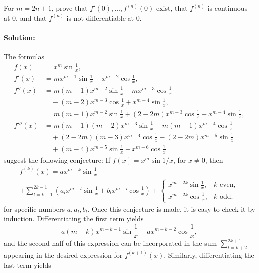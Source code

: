 \documentclass{article}
\begin{document}
For $m = 2n + 1$, prove that $f'(0), \ldots, f^{(n)}(0)$ exist, that $f^{(n)}$
is continuous at 0, and that $f^{(n)}$ is not differentiable at 0.

\paragraph{Solution:} The formulas \begin{align*}
  f(x) &= x^m\sin{\frac{1}{x}}, \\
  f'(x) &= mx^{m - 1}\sin{\frac{1}{x}} - x^{m - 2}\cos{\frac{1}{x}}, \\
  f''(x) &= m(m - 1)x^{m - 2}\sin{\frac{1}{x}} - mx^{m - 3}\cos{\frac{1}{x}} \\
    &\quad - (m - 2)x^{m - 3}\cos{\frac{1}{x}} + x^{m - 4}\sin{\frac{1}{x}}, \\
    &= m(m - 1)x^{m - 2}\sin{\frac{1}{x}} + (2 - 2m)x^{m - 3}\cos{\frac{1}{x}}
      + x^{m - 4}\sin{\frac{1}{x}}, \\
  f'''(x) &= m(m - 1)(m - 2)x^{m - 3}\sin{\frac{1}{x}} - m(m - 1)x^{m - 4}\cos{
    \frac{1}{x}} \\
    &\quad + (2 - 2m)(m - 3)x^{m - 4}\cos{\frac{1}{x}} - (2 - 2m)x^{m - 5}\sin{
      \frac{1}{x}} \\
    &\quad + (m - 4)x^{m - 5}\sin{\frac{1}{x}} - x^{m - 6}\cos{\frac{1}{x}}
\end{align*} suggest the following conjecture: If $f(x) = x^m\sin{1/x}$, for $x
\neq 0$, then \begin{multline*}
  f^{(k)}(x) = ax^{m - k}\sin{\frac{1}{x}} \\
    + \sum_{l = k + 1}^{2k - 1}\left(a_lx^{m - l}\sin{\frac{1}{x}} + b_lx^{m -
    l}\cos{\frac{1}{x}}\right) \pm \begin{cases}
      x^{m - 2k}\sin{\frac{1}{x}}, &k \text{ even}, \\
      x^{m - 2k}\cos{\frac{1}{x}}, &k \text{ odd}.
    \end{cases}
\end{multline*} for specific numbers $a, a_l, b_l$. Once this conjecture is
made, it is easy to check it by induction. Differentiating the first term
yields \begin{equation*}
  a(m - k)x^{m - k - 1}\sin{\frac{1}{x}} - ax^{m - k - 2}\cos{\frac{1}{x}},
\end{equation*} and the second half of this expression can be incorporated in
the sum $\sum_{l = k + 2}^{2k + 1}$ appearing in the desired expression for
$f^{(k + 1)}(x)$. Similarly, differentiating the last term yields
\end{document}
